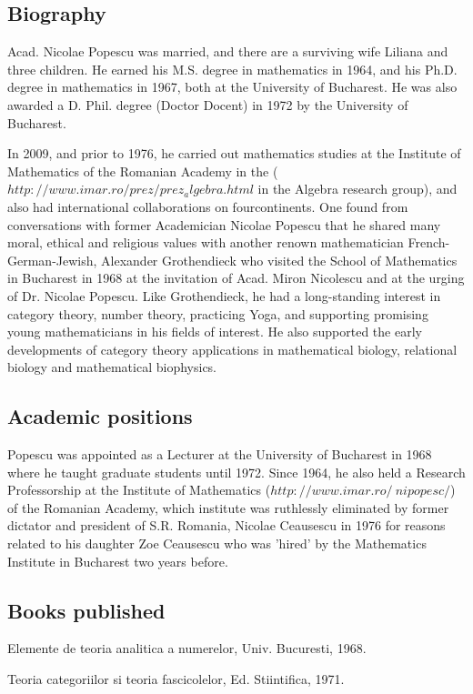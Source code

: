\documentclass[12pt]{article}
\theoremstyle{plain}
\theoremstyle{definition}
\numberwithin{equation}{section}
\begin{document}
\subsection{Biography}
Acad. Nicolae Popescu was married, and there are a surviving wife Liliana and three children. He earned his M.S. degree in mathematics in 1964, and his Ph.D. degree in mathematics in 1967, both at the University of Bucharest. He was also awarded a D. Phil. degree (Doctor Docent) in 1972 by the University of Bucharest. 

In 2009, and prior to 1976, he carried out mathematics studies at the Institute of Mathematics of the Romanian Academy in the ($http://www.imar.ro/prez/prez_algebra.html$ in the Algebra research group), and also had international collaborations on fourcontinents. One found from conversations with former Academician Nicolae Popescu that he shared many moral, ethical and religious values with another renown mathematician French-German-Jewish, Alexander Grothendieck who visited the School of Mathematics in Bucharest in 1968 at the invitation of Acad. Miron Nicolescu and at the urging of Dr. Nicolae Popescu. Like Grothendieck, he had a long-standing interest in category theory, number theory, practicing Yoga, and supporting promising young mathematicians in his fields of interest. He also supported the early developments of category theory applications in mathematical biology, relational biology and mathematical biophysics.

\subsection{Academic positions}
Popescu was appointed as a Lecturer at the University of Bucharest in 1968 where he taught graduate students until 1972. Since 1964, he also held a  Research Professorship at the Institute of Mathematics ($http://www.imar.ro/~nipopesc/$) of the Romanian Academy, which institute was ruthlessly eliminated by former dictator and president of S.R. Romania, Nicolae Ceausescu in 1976 for reasons related to his daughter Zoe Ceausescu who was 'hired' by the Mathematics Institute in Bucharest two years before.

\subsection{Books published}

Elemente de teoria analitica a numerelor, Univ. Bucuresti, 1968.

Teoria categoriilor si teoria fascicolelor, Ed. Stiintifica, 1971.
 
\end{document}
